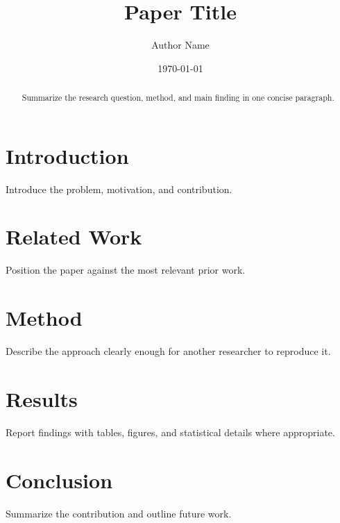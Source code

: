 \documentclass[11pt]{article}
\title{Paper Title}
\author{Author Name}
\date{\today}
\begin{document}
\maketitle

\begin{abstract}
Summarize the research question, method, and main finding in one concise paragraph.
\end{abstract}

\section{Introduction}
Introduce the problem, motivation, and contribution.

\section{Related Work}
Position the paper against the most relevant prior work.

\section{Method}
Describe the approach clearly enough for another researcher to reproduce it.

\section{Results}
Report findings with tables, figures, and statistical details where appropriate.

\section{Conclusion}
Summarize the contribution and outline future work.



\end{document}
